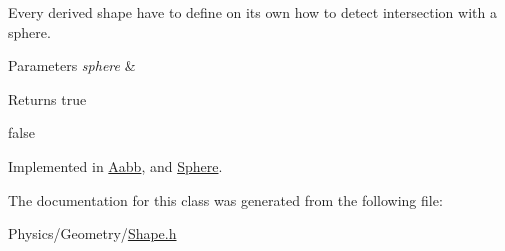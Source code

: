 Every derived shape have to define on its own how to detect intersection with a sphere. 


\begin{DoxyParams}{Parameters}
{\em sphere} & \\
\hline
\end{DoxyParams}
\begin{DoxyReturn}{Returns}
true 

false 
\end{DoxyReturn}


Implemented in \hyperlink{classAabb_af08568647c234b68334892b20885084a}{Aabb}, and \hyperlink{classSphere_aa97baa4e07d8b042f99150df0757d623}{Sphere}.



The documentation for this class was generated from the following file\+:\begin{DoxyCompactItemize}
\item 
Physics/\+Geometry/\hyperlink{Shape_8h}{Shape.\+h}\end{DoxyCompactItemize}
